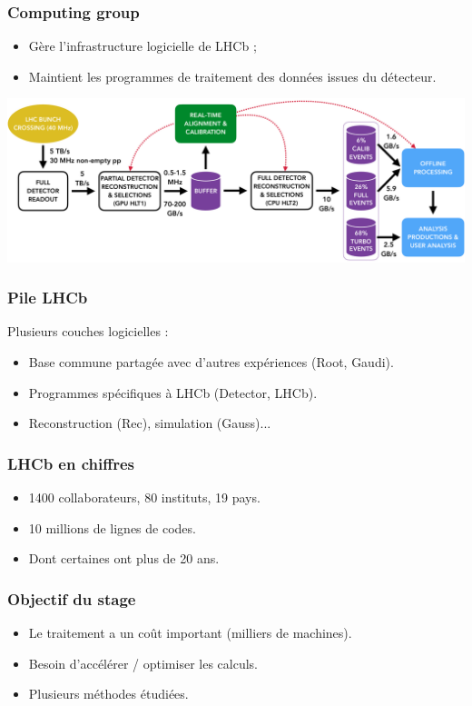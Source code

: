\documentclass{beamer}
\begin{document}
\begin{frame}
    \frametitle{Computing group}

    \begin{itemize}
        \item Gère l'infrastructure logicielle de LHCb ;
        \item Maintient les programmes de traitement des données issues du détecteur.
    \end{itemize}

    \includegraphics[width=\textwidth]{LHCb_stack.png}
\end{frame}

\begin{frame}
    \frametitle{Pile LHCb}

    Plusieurs couches logicielles :
    \begin{itemize}
        \item Base commune partagée avec d'autres expériences (Root, Gaudi).
        \item Programmes spécifiques à LHCb (Detector, LHCb).
        \item Reconstruction (Rec), simulation (Gauss)...
    \end{itemize}
\end{frame}

\begin{frame}
    \frametitle{LHCb en chiffres}

    \begin{itemize}
        \item 1400 collaborateurs, 80 instituts, 19 pays.
        \item 10 millions de lignes de codes.
        \item Dont certaines ont plus de 20 ans.
    \end{itemize}
\end{frame}

\begin{frame}
    \frametitle{Objectif du stage}

    \begin{itemize}
        \item Le traitement a un coût important (milliers de machines).
        \item Besoin d'accélérer / optimiser les calculs.
        \item Plusieurs méthodes étudiées.
    \end{itemize}
\end{frame}
\end{document}
